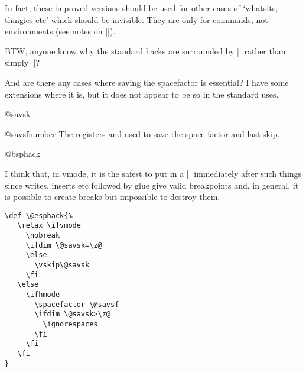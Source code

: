     In fact, these improved versions should be used for other cases
    of `whatsits, thingies etc' which should be invisible.  They are
    only for commands, not environments (see notes on |\@Esphack|).

    BTW, anyone know why the standard hacks are surrounded by
    |\ifmmode\else| rather than simply |\ifhmode|?

    And are there any cases where saving the spacefactor is
    essential?  I have some extensions where it is, but it does not
    appear to be so in the standard uses.
\begin{docCommand}{@savsk}{}
\end{docCommand}
\begin{docCommand}{@savsf}{number}
 The registers  and  used to save the space factor and last skip.
\end{docCommand}
    \begin{teX}
\newdimen\@savsk
\newcount\@savsf
    \end{teX}

  

\begin{docCommand}{@bsphack}{}
\end{docCommand}
\begin{teX}
\def \@bsphack{%
  \relax \ifvmode
    \@savsk \lastskip
    \ifdim \lastskip=\z@
    \else
      \vskip -\lastskip
    \fi
  \else
    \ifhmode
      \@savsk \lastskip
      \@savsf \spacefactor
    \fi
  \fi
}
\end{teX}




    I think that, in vmode, it is the safest to put
    in a |\nobreak| immediately after such things since writes,
    inserts etc followed by glue give valid breakpoints and, in
    general, it is possible to create breaks but impossible to
    destroy them.
\begin{verbatim}
\def \@esphack{%
   \relax \ifvmode 
     \nobreak    
     \ifdim \@savsk=\z@ 
     \else 
       \vskip\@savsk
     \fi
   \else 
     \ifhmode
       \spacefactor \@savsf
       \ifdim \@savsk>\z@ 
         \ignorespaces
       \fi 
     \fi
   \fi
} 
\end{verbatim}

